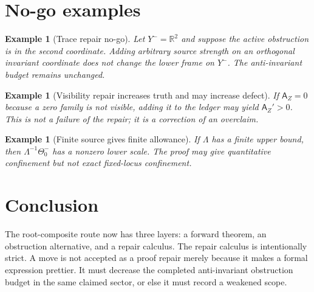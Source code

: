 \documentclass[11pt]{article}
\newtheorem{example}[theorem]{Example}
\newcommand{\AZ}{\mathsf A_Z}
\newcommand{\ThetaZero}{\Theta^-_0}
\begin{document}
\section{No-go examples}

\begin{example}[Trace repair no-go]
Let $Y^-=\mathbb R^2$ and suppose the active obstruction is in the second coordinate.  Adding arbitrary source strength on an orthogonal invariant coordinate does not change the lower frame on $Y^-$.  The anti-invariant budget remains unchanged.
\end{example}

\begin{example}[Visibility repair increases truth and may increase defect]
If $\AZ=0$ because a zero family is not visible, adding it to the ledger may yield $\AZ'>0$.  This is not a failure of the repair; it is a correction of an overclaim.
\end{example}

\begin{example}[Finite source gives finite allowance]
If $\Lambda$ has a finite upper bound, then $\Lambda^{-1}\ThetaZero$ has a nonzero lower scale.  The proof may give quantitative confinement but not exact fixed-locus confinement.
\end{example}

\section{Conclusion}

The root-composite route now has three layers: a forward theorem, an obstruction alternative, and a repair calculus.  The repair calculus is intentionally strict.  A move is not accepted as a proof repair merely because it makes a formal expression prettier.  It must decrease the completed anti-invariant obstruction budget in the same claimed sector, or else it must record a weakened scope.
\end{document}
